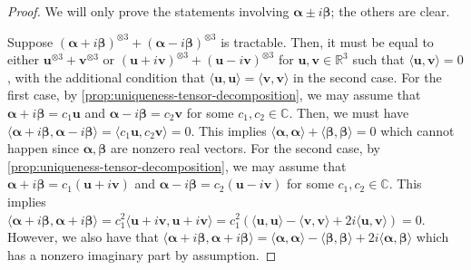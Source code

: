 \documentclass[11pt]{article}
\newcommand{\teh}{^{\otimes 3}}
\begin{document}
\begin{proof}
We will only prove the statements involving $\boldsymbol{\alpha} \pm i \boldsymbol{\beta}$; the others are clear.

Suppose $(\boldsymbol{\alpha} + i \boldsymbol{\beta})\teh + (\boldsymbol{\alpha} - i \boldsymbol{\beta})\teh$ is tractable.
Then, it must be equal to either $\mathbf{u}\teh + \mathbf{v}\teh$ or $(\mathbf{u} + i \mathbf{v}) \teh + (\mathbf{u} - i \mathbf{v})\teh$ for 
$\mathbf{u}, \mathbf{v} \in \mathbb{R}^3$ such that $\langle \mathbf{u}, \mathbf{v} \rangle = 0$, with the additional condition that $\langle \mathbf{u}, \mathbf{u} \rangle = \langle \mathbf{v}, \mathbf{v} \rangle$ in the second case.
For the first case, by \cref{prop:uniqueness-tensor-decomposition}, we may assume that $\boldsymbol{\alpha} + i \boldsymbol{\beta} = c_1 \mathbf{u}$ and $\boldsymbol{\alpha} - i \boldsymbol{\beta} = c_2 \mathbf{v}$ for some $c_1, c_2 \in \mathbb{C}$.
Then, we must have $\langle \boldsymbol{\alpha} + i \boldsymbol{\beta}, \boldsymbol{\alpha} - i \boldsymbol{\beta} \rangle = \langle c_1 \mathbf{u}, c_2 \mathbf{v} \rangle = 0$. 
This implies $\langle \boldsymbol{\alpha}, \boldsymbol{\alpha} \rangle + \langle \boldsymbol{\beta}, \boldsymbol{\beta} \rangle = 0$ which cannot happen since $\boldsymbol{\alpha}, \boldsymbol{\beta}$ are nonzero real vectors.
For the second case, by \cref{prop:uniqueness-tensor-decomposition}, we may assume that $\boldsymbol{\alpha} + i \boldsymbol{\beta} = c_1 (\mathbf{u} + i \mathbf{v})$ and $\boldsymbol{\alpha} - i \boldsymbol{\beta} = c_2 (\mathbf{u} - i \mathbf{v})$ for some $c_1, c_2 \in \mathbb{C}$.
This implies $\langle \boldsymbol{\alpha} + i \boldsymbol{\beta} , \boldsymbol{\alpha} + i \boldsymbol{\beta}  \rangle = c_1^2 \langle \mathbf{u} + i \mathbf{v}, \mathbf{u} + i \mathbf{v} \rangle = c_1^2(\langle \mathbf{u}, \mathbf{u} \rangle - \langle \mathbf{v}, \mathbf{v} \rangle + 2 i \langle \mathbf{u}, \mathbf{v} \rangle) = 0$.
However, we also have that $\langle \boldsymbol{\alpha} + i \boldsymbol{\beta}, \boldsymbol{\alpha} + i \boldsymbol{\beta} \rangle = \langle \boldsymbol{\alpha}, \boldsymbol{\alpha} \rangle - \langle \boldsymbol{\beta}, \boldsymbol{\beta} \rangle + 2 i \langle \boldsymbol{\alpha}, \boldsymbol{\beta} \rangle $ which has a nonzero imaginary part by assumption.
\end{proof}


 
\end{document}
